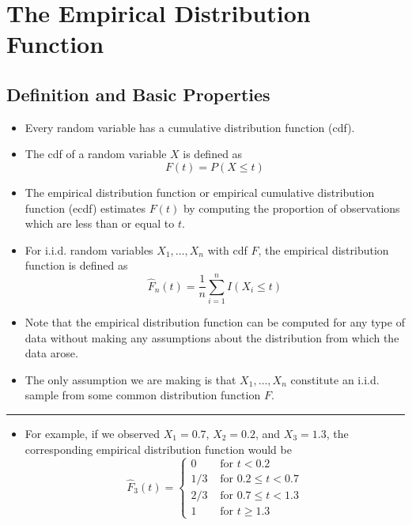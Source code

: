 \documentclass[]{book}
\providecommand{\tightlist}{%
  \setlength{\itemsep}{0pt}\setlength{\parskip}{0pt}}
\begin{document}
\hypertarget{edf}{%
\chapter{The Empirical Distribution Function}\label{edf}}

\hypertarget{definition-and-basic-properties}{%
\section{Definition and Basic Properties}\label{definition-and-basic-properties}}

\begin{itemize}
\item
  Every random variable has a cumulative distribution function (cdf).
\item
  The cdf of a random variable \(X\) is defined as
  \begin{equation}
  F(t) = P( X \leq t)
  \end{equation}
\item
  The empirical distribution function or empirical cumulative distribution function (ecdf)
  estimates \(F(t)\) by computing the proportion of observations which are less than or equal
  to \(t\).
\item
  For i.i.d. random variables \(X_{1}, \ldots, X_{n}\) with cdf \(F\), the empirical distribution function
  is defined as
  \begin{equation}
  \hat{F}_{n}(t) = \frac{1}{n}\sum_{i=1}^{n} I( X_{i} \leq t) \nonumber
  \end{equation}
\item
  Note that the empirical distribution function can be computed for any type
  of data without making any assumptions about the distribution from which
  the data arose.
\item
  The only assumption we are making is that \(X_{1}, \ldots, X_{n}\)
  constitute an i.i.d. sample from some common distribution function \(F\).
\end{itemize}

\begin{center}\rule{0.5\linewidth}{\linethickness}\end{center}

\begin{itemize}
\tightlist
\item
  For example, if we observed \(X_{1} = 0.7\), \(X_{2} = 0.2\), and \(X_{3} = 1.3\),
  the corresponding empirical distribution function would be
  \begin{equation}
  \hat{F}_{3}(t) = 
  \begin{cases}
  0 & \textrm{ for } t < 0.2  \\
  1/3 & \textrm{ for } 0.2 \leq t < 0.7 \\
  2/3 & \textrm{ for } 0.7 \leq t < 1.3 \\
  1   & \textrm{ for } t \geq 1.3
  \end{cases}
  \end{equation}
\end{itemize}
\end{document}
